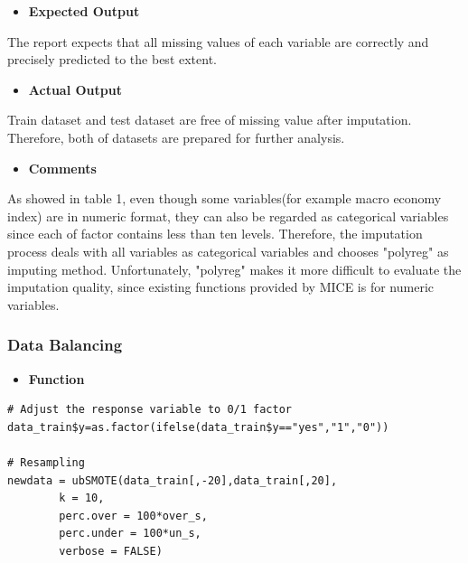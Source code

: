         \begin{itemize}
         	\item \textbf{Expected Output}
         \end{itemize}
         The report expects that all missing values of each variable are correctly and precisely predicted to the best extent. \\
         \begin{itemize}
         	\item \textbf{Actual Output}
         \end{itemize}
          Train dataset and test dataset are free of missing value after imputation. Therefore, both of datasets are prepared for further analysis. \\
         \begin{itemize}
         	\item \textbf{Comments}
         \end{itemize}
     \noindent As showed in table 1, even though some variables(for example macro economy index) are in numeric format, they can also be regarded as categorical variables since each of factor contains less than ten levels. Therefore, the imputation process deals with all variables as categorical variables and chooses "polyreg" as imputing method. Unfortunately, "polyreg" makes it more difficult to evaluate the imputation quality, since existing functions provided by MICE is for numeric variables.\\
       \subsubsection{Data Balancing}
       \begin{itemize}
       	\item \textbf{Function}
       \end{itemize}
\begin{lstlisting}
# Adjust the response variable to 0/1 factor
data_train$y=as.factor(ifelse(data_train$y=="yes","1","0"))

# Resampling
newdata = ubSMOTE(data_train[,-20],data_train[,20], 
		k = 10, 
		perc.over = 100*over_s, 
		perc.under = 100*un_s,
		verbose = FALSE)
\end{lstlisting}

